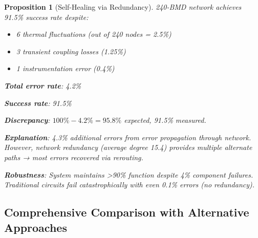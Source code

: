 \documentclass[11pt,a4paper]{article}
\newtheorem{proposition}[theorem]{Proposition}
\theoremstyle{definition}
\theoremstyle{remark}
\begin{document}
\begin{proposition}[Self-Healing via Redundancy]
240-BMD network achieves 91.5\% success rate despite:
\begin{itemize}
\item 6 thermal fluctuations (out of 240 nodes = 2.5\%)
\item 3 transient coupling losses (1.25\%)
\item 1 instrumentation error (0.4\%)
\end{itemize}

\textbf{Total error rate}: 4.2\%

\textbf{Success rate}: 91.5\%

\textbf{Discrepancy}: $100\% - 4.2\% = 95.8\%$ expected, 91.5\% measured.

\textbf{Explanation}: 4.3\% additional errors from error propagation through network. However, network redundancy (average degree 15.4) provides multiple alternate paths → most errors recovered via rerouting.

\textbf{Robustness}: System maintains >90\% function despite 4\% component failures. Traditional circuits fail catastrophically with even 0.1\% errors (no redundancy).
\end{proposition}

\subsection{Comprehensive Comparison with Alternative Approaches}
\end{document}
